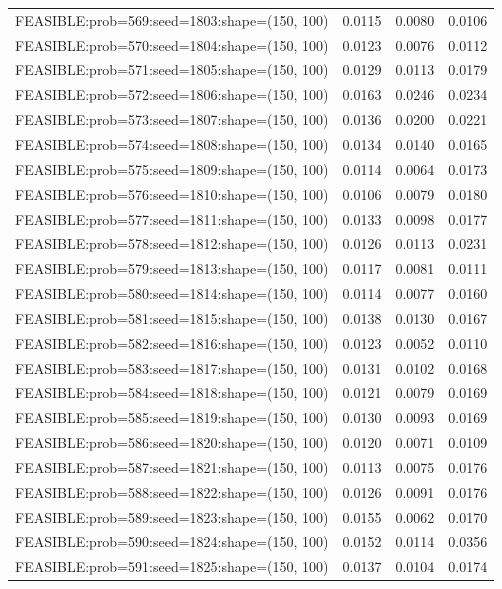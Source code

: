 \begin{longtable}{lccc}
FEASIBLE:prob=569:seed=1803:shape=(150, 100) &   0.0115 & 0.0080 & 0.0106 \\
FEASIBLE:prob=570:seed=1804:shape=(150, 100) &   0.0123 & 0.0076 & 0.0112 \\
FEASIBLE:prob=571:seed=1805:shape=(150, 100) &   0.0129 & 0.0113 & 0.0179 \\
FEASIBLE:prob=572:seed=1806:shape=(150, 100) &   0.0163 & 0.0246 & 0.0234 \\
FEASIBLE:prob=573:seed=1807:shape=(150, 100) &   0.0136 & 0.0200 & 0.0221 \\
FEASIBLE:prob=574:seed=1808:shape=(150, 100) &   0.0134 & 0.0140 & 0.0165 \\
FEASIBLE:prob=575:seed=1809:shape=(150, 100) &   0.0114 & 0.0064 & 0.0173 \\
FEASIBLE:prob=576:seed=1810:shape=(150, 100) &   0.0106 & 0.0079 & 0.0180 \\
FEASIBLE:prob=577:seed=1811:shape=(150, 100) &   0.0133 & 0.0098 & 0.0177 \\
FEASIBLE:prob=578:seed=1812:shape=(150, 100) &   0.0126 & 0.0113 & 0.0231 \\
FEASIBLE:prob=579:seed=1813:shape=(150, 100) &   0.0117 & 0.0081 & 0.0111 \\
FEASIBLE:prob=580:seed=1814:shape=(150, 100) &   0.0114 & 0.0077 & 0.0160 \\
FEASIBLE:prob=581:seed=1815:shape=(150, 100) &   0.0138 & 0.0130 & 0.0167 \\
FEASIBLE:prob=582:seed=1816:shape=(150, 100) &   0.0123 & 0.0052 & 0.0110 \\
FEASIBLE:prob=583:seed=1817:shape=(150, 100) &   0.0131 & 0.0102 & 0.0168 \\
FEASIBLE:prob=584:seed=1818:shape=(150, 100) &   0.0121 & 0.0079 & 0.0169 \\
FEASIBLE:prob=585:seed=1819:shape=(150, 100) &   0.0130 & 0.0093 & 0.0169 \\
FEASIBLE:prob=586:seed=1820:shape=(150, 100) &   0.0120 & 0.0071 & 0.0109 \\
FEASIBLE:prob=587:seed=1821:shape=(150, 100) &   0.0113 & 0.0075 & 0.0176 \\
FEASIBLE:prob=588:seed=1822:shape=(150, 100) &   0.0126 & 0.0091 & 0.0176 \\
FEASIBLE:prob=589:seed=1823:shape=(150, 100) &   0.0155 & 0.0062 & 0.0170 \\
FEASIBLE:prob=590:seed=1824:shape=(150, 100) &   0.0152 & 0.0114 & 0.0356 \\
FEASIBLE:prob=591:seed=1825:shape=(150, 100) &   0.0137 & 0.0104 & 0.0174 \\

\end{longtable}
